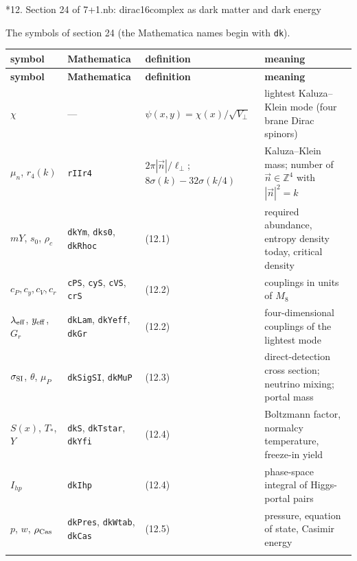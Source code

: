 \documentclass[10pt,a4paper]{article}
\makeatletter
\renewcommand\section{\@startsection{section}{1}{\z@}{-3.5ex \@plus -1ex \@minus -.2ex}{2.3ex \@plus.2ex}{\normalfont\Large\bfseries\raggedright}}
\makeatother
\begin{document}
\section*{12. Section 24 of 7+1.nb: dirac16complex as dark matter and dark energy}
The symbols of section 24 (the Mathematica names begin with \texttt{dk}).

{\footnotesize
\begin{longtable}{>{\raggedright\arraybackslash}p{}>{\raggedright\arraybackslash}p{}>{\raggedright\arraybackslash}p{}>{\raggedright\arraybackslash}p{}}
\toprule
\textbf{symbol} & \textbf{Mathematica} & \textbf{definition} & \textbf{meaning} \\
\midrule\endfirsthead
\toprule
\textbf{symbol} & \textbf{Mathematica} & \textbf{definition} & \textbf{meaning} \\
\midrule\endhead
\endfoot
\bottomrule\endlastfoot
$\chi$ & — & $\psi(x,y)=\chi(x)/\sqrt{V_\perp}$ & lightest Kaluza–Klein mode (four brane Dirac spinors) \\
$\mu_n$, $r_4(k)$ & \texttt{rIIr4} & $2\pi|\vec n|/\ell_\perp$; $8\sigma(k)-32\sigma(k/4)$ & Kaluza–Klein mass; number of $\vec n\in\mathbb Z^4$ with $|\vec n|^2=k$ \\
$mY$, $s_0$, $\rho_c$ & \texttt{dkYm}, \texttt{dks0}, \texttt{dkRhoc} & (12.1) & required abundance, entropy density today, critical density \\
$c_P,c_y,c_V,c_r$ & \texttt{cPS}, \texttt{cyS}, \texttt{cVS}, \texttt{crS} & (12.2) & couplings in units of $M_8$ \\
$\lambda_{\rm eff}$, $y_{\rm eff}$, $G_r$ & \texttt{dkLam}, \texttt{dkYeff}, \texttt{dkGr} & (12.2) & four-dimensional couplings of the lightest mode \\
$\sigma_{\rm SI}$, $\theta$, $\mu_P$ & \texttt{dkSigSI}, \texttt{dkMuP} & (12.3) & direct-detection cross section; neutrino mixing; portal mass \\
$S(x)$, $T_*$, $Y$ & \texttt{dkS}, \texttt{dkTstar}, \texttt{dkYfi} & (12.4) & Boltzmann factor, normalcy temperature, freeze-in yield \\
$I_{hp}$ & \texttt{dkIhp} & (12.4) & phase-space integral of Higgs-portal pairs \\
$p$, $w$, $\rho_{\rm Cas}$ & \texttt{dkPres}, \texttt{dkWtab}, \texttt{dkCas} & (12.5) & pressure, equation of state, Casimir energy \\*
\end{longtable}}
\end{document}
